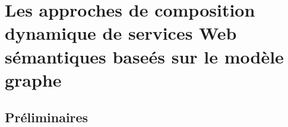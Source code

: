 \chapter{Les approches de composition dynamique de services Web sémantiques baseés sur le modèle graphe}
\newpage
\section{Préliminaires}


